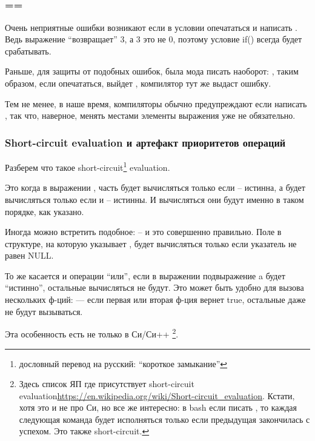 ﻿\subsection{}

\subsubsection{==}

Очень неприятные ошибки возникают если в условии  опечататься и написать .
Ведь выражение  ``возвращает'' 3, а 3 это не 0, поэтому условие if() всегда будет 
срабатывать.

Раньше, для защиты от подобных ошибок, была мода писать наоборот: , таким образом,
если опечататься, выйдет , компилятор тут же выдаст ошибку.

Тем не менее, в наше время, компиляторы обычно предупреждают если написать , 
так что, наверное, менять местами элементы выражения уже не обязательно.

\subsubsection{Short-circuit evaluation и артефакт приоритетов операций}

Разберем что такое short-circuit\footnote{дословный перевод на русский: ``короткое замыкание''} evaluation.

Это когда в выражении , часть  будет вычисляться только если  -- истинна,
а  будет вычисляться
только если  и  -- истинны. И вычисляться они будут именно в таком порядке, как указано.

Иногда можно встретить подобное:  -- и это совершенно правильно.
Поле  в структуре,
на которую указывает , будет вычисляться только если указатель  не равен NULL.

То же касается и операции ``или'', если в выражении  подвыражение a будет ``истинно'',
остальные вычисляться не будут. Это может быть удобно для вызова нескольких ф-ций: 
 --- если первая или вторая ф-ция вернет true, 
остальные даже не будут вызываться.

Эта особенность есть не только в Си/Си++
\footnote{Здесь список ЯП где присутствует short-circuit evaluation\url{https://en.wikipedia.org/wiki/Short-circuit_evaluation}. Кстати, хотя это и не про Си, но все же интересно: в bash если писать , то каждая следующая команда будет исполняться только если предыдущая закончилась с успехом. Это также short-circuit.}.

